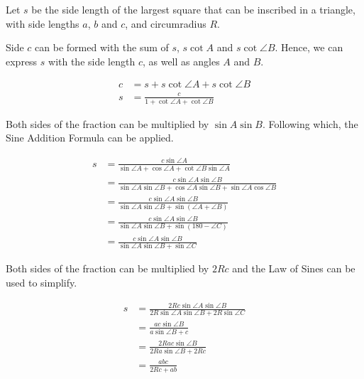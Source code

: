 \documentclass[12pt]{scrartcl}
\begin{document}
Let $s$ be the side length of the largest square that can be inscribed in a triangle,
with side lengths $a$, $b$ and $c$, and circumradius $R$.

Side $c$ can be formed with the sum of $s$, $s \cot A$ and $s \cot \angle{B}$.
Hence, we can express $s$ with the side length $c$, as well as angles $A$ and $B$.

\begin{align*}
	c & = s+s\cot \angle{A}+s\cot \angle{B}          \\
	s & = \frac{c}{1+\cot \angle{A}+\cot \angle{B}}                                                                            
\end{align*}

Both sides of the fraction can be multiplied by $\sin A \sin B$. Following which, the
Sine Addition Formula can be applied.

\begin{align*}
	s & = \frac{c \sin\angle{A}}{\sin\angle{A}+\cos\angle{A}+\cot\angle{B}\sin\angle{A}}                                       \\
	  & = \frac{c\sin\angle{A}\sin\angle{B}}{\sin\angle{A}\sin\angle{B}+\cos\angle{A}\sin\angle{B}+\sin\angle{A}\cos\angle{B}} \\
	  & = \frac{c\sin\angle{A}\sin\angle{B}}{\sin\angle{A}\sin\angle{B}+\sin\left(\angle{A}+\angle{B}\right)}                  \\
	  & = \frac{c\sin\angle{A}\sin\angle{B}}{\sin\angle{A}\sin\angle{B}+\sin\left(180-\angle C\right)}                         \\
	  & = \frac{c\sin\angle{A}\sin\angle{B}}{\sin\angle{A}\sin\angle{B}+\sin \angle C}                                         
\end{align*}

Both sides of the fraction can be multiplied by $2Rc$ and the Law of Sines can be used to simplify.

\begin{align*}
	 s & = \frac{2Rc\sin\angle{A}\sin\angle{B}}{2R\sin\angle{A}\sin \angle{B}+2R\sin \angle C}                                  \\
	  & = \frac{ac\sin\angle{B}}{a\sin\angle{B}+c}                                                                             \\
	  & = \frac{2Rac\sin\angle{B}}{2Ra\sin\angle{B}+2Rc}                                                                       \\
	  & = \frac{abc}{2Rc+ab}
\end{align*}
\end{document}
